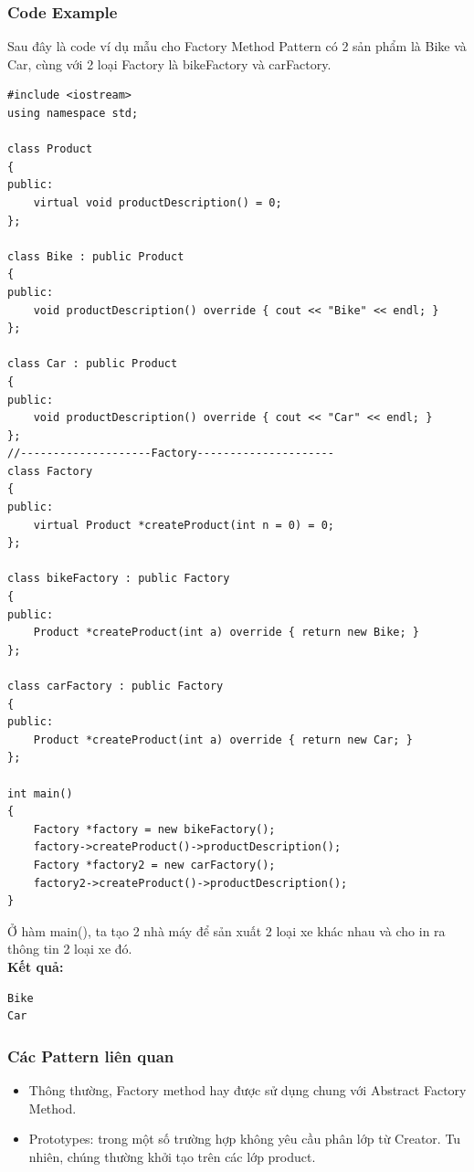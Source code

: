 \subsubsection{Code Example}
Sau đây là code ví dụ mẫu cho Factory Method Pattern có 2 sản phẩm là Bike và Car, cùng với 2 loại Factory là bikeFactory và carFactory. \\
\begin{lstlisting}
#include <iostream>
using namespace std;

class Product
{
public:
    virtual void productDescription() = 0;
};

class Bike : public Product
{
public:
    void productDescription() override { cout << "Bike" << endl; }
};

class Car : public Product
{
public:
    void productDescription() override { cout << "Car" << endl; }
};
//--------------------Factory---------------------
class Factory
{
public:
    virtual Product *createProduct(int n = 0) = 0;
};

class bikeFactory : public Factory
{
public:
    Product *createProduct(int a) override { return new Bike; }
};

class carFactory : public Factory
{
public:
    Product *createProduct(int a) override { return new Car; }
};

int main()
{
    Factory *factory = new bikeFactory();
    factory->createProduct()->productDescription();
    Factory *factory2 = new carFactory();
    factory2->createProduct()->productDescription();
}
\end{lstlisting}
Ở hàm main(), ta tạo 2 nhà máy để sản xuất 2 loại xe khác nhau và cho in ra thông tin 2 loại xe đó.\\
\newline
\textbf{Kết quả:}
\begin{lstlisting}
Bike
Car
\end{lstlisting}
\subsubsection{Các Pattern liên quan}
\begin{itemize}
    \item Thông thường, Factory method hay được sử dụng chung với Abstract Factory Method.
    \item Prototypes: trong một số trường hợp không yêu cầu phân lớp từ Creator. Tu nhiên, chúng thường khởi tạo trên các lớp product.
\end{itemize}